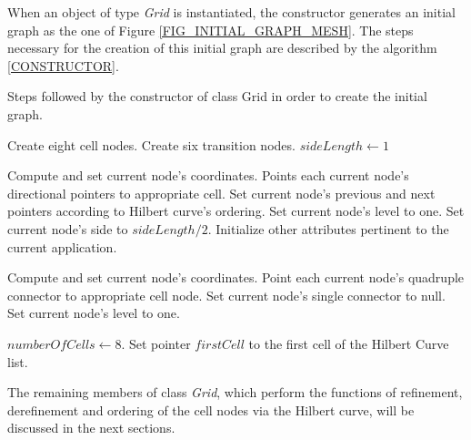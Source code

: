 When an object of type \textit{Grid} is instantiated, the
constructor generates an initial graph as the one of Figure
\ref{FIG_INITIAL_GRAPH_MESH}. The steps necessary for the creation
of this initial graph are described by the algorithm
\ref{CONSTRUCTOR}.

\begin{algorithm}[!ht]
    \caption{Steps followed by the constructor of class Grid in order to create the initial graph.}
    \small{
    \begin{algorithmic}[1]
            \State Create eight cell nodes.
            \State Create six transition nodes.
            \State $sideLength \gets 1$

            \State
                \State Compute and set current node's coordinates.
                \State Points each current node's directional pointers to appropriate cell.
                \State Set current node's previous and next pointers according to Hilbert curve's ordering.
                \State Set current node's level to one.
                \State Set current node's side to $sideLength / 2$.
                \State Initialize other attributes pertinent to the current application.
            \EndFor

            \State
                \State Compute and set current node's coordinates.
                \State Point each current node's quadruple connector to appropriate cell node.
                \State Set current node's single connector to null.
                \State Set current node's level to one.
            \EndFor

            \State
            \State $numberOfCells \gets 8$.
            \State Set pointer $firstCell$ to the first cell of the Hilbert Curve list.
    \end{algorithmic} \label{CONSTRUCTOR}
    }
\end{algorithm}

The remaining members of class \textit{Grid}, which perform the
functions of refinement, derefinement and ordering of the cell nodes
via the Hilbert curve, will be discussed in the next sections.
